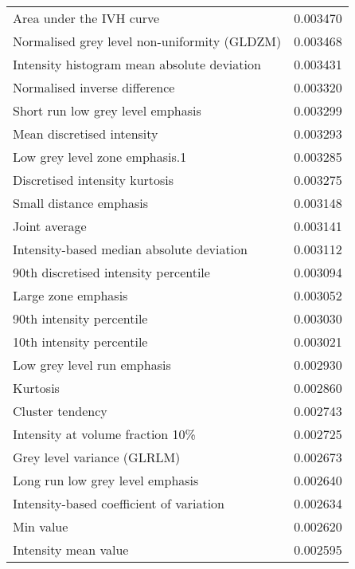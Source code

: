 \begin{longtable}{|lr|}
Area under the IVH curve                           &        0.003470 \\
Normalised grey level non-uniformity (GLDZM)       &        0.003468 \\
Intensity histogram mean absolute deviation        &        0.003431 \\
Normalised inverse difference                      &        0.003320 \\
Short run low grey level emphasis                  &        0.003299 \\
Mean discretised intensity                         &        0.003293 \\
Low grey level zone emphasis.1                     &        0.003285 \\
Discretised intensity kurtosis                     &        0.003275 \\
Small distance emphasis                            &        0.003148 \\
Joint average                                      &        0.003141 \\
Intensity-based median absolute deviation          &        0.003112 \\
90th discretised intensity percentile              &        0.003094 \\
Large zone emphasis                                &        0.003052 \\
90th intensity percentile                          &        0.003030 \\
10th intensity percentile                          &        0.003021 \\
Low grey level run emphasis                        &        0.002930 \\
Kurtosis                                           &        0.002860 \\
Cluster tendency                                   &        0.002743 \\
Intensity at volume fraction 10\%                   &        0.002725 \\
Grey level variance (GLRLM)                        &        0.002673 \\
Long run low grey level emphasis                   &        0.002640 \\
Intensity-based coefficient of variation           &        0.002634 \\
Min value                                          &        0.002620 \\
Intensity mean value                               &        0.002595 \\

\end{longtable}
